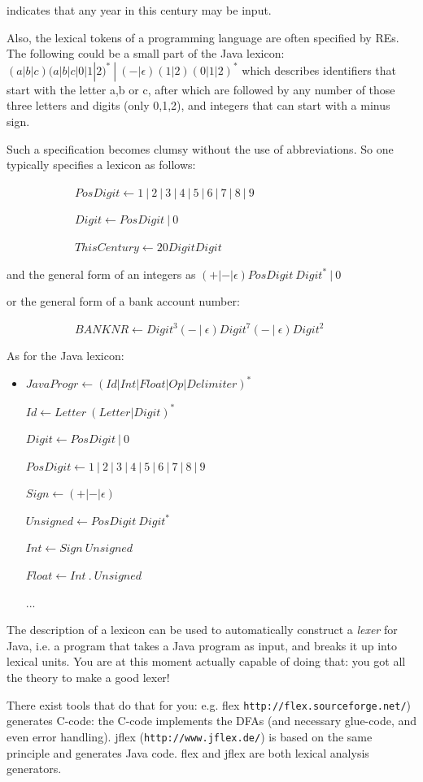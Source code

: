 indicates that any year in this century may be input.

Also, the lexical tokens of a programming language are often specified
by REs. The following could be a small part of the Java lexicon:
$(a|b|c)(a|b|c|0|1|2)^*~|~(-|\epsilon)(1|2)(0|1|2)^*$ which describes
identifiers that start with the letter a,b or c, after which are
followed by any number of those three letters and digits (only 0,1,2),
and integers that can start with a minus sign.

Such a specification becomes clumsy without the use of
abbreviations. So one typically specifies a lexicon as follows:


~~~~~~~~~~~~$PosDigit \leftarrow 1~|~2~|~3~|~4~|~5~|~6~|~7~|~8~|~9$

~~~~~~~~~~~~$Digit \leftarrow PosDigit~|~0$


~~~~~~~~~~~~$ThisCentury \leftarrow 20DigitDigit$

and the general form of an integers as $(+|-|\epsilon)PosDigit~Digit^*~|~0$

or the general form of a bank account number:


~~~~~~~~~~~~$BANKNR \leftarrow Digit^3(-~|~\epsilon)Digit^7(-~|~\epsilon)Digit^2$

As for the Java lexicon:


\begin{itemize}
\item[]
$JavaProgr \leftarrow (Id|Int|Float|Op|Delimiter)^*$

$Id \leftarrow Letter~(Letter|Digit)^*$

$Digit \leftarrow PosDigit~|~0$

$PosDigit \leftarrow 1~|~2~|~3~|~4~|~5~|~6~|~7~|~8~|~9$

$Sign \leftarrow (+|-|\epsilon)$

$Unsigned \leftarrow PosDigit~Digit^*$

$Int \leftarrow Sign~Unsigned$

$Float \leftarrow Int~.~Unsigned$

...
\end{itemize}

\label{flexlabel}
The description of a lexicon can be used to automatically construct a
{\em lexer} for Java, i.e. a program that takes a Java program as input,
and breaks it up into lexical units. You are at this moment actually
capable of doing that: you got all the theory to make a good lexer!

There exist tools that do that for you: e.g. flex
\verb|http://flex.sourceforge.net/|) generates C-code: the C-code
implements the DFAs (and necessary glue-code, and even error
handling). jflex (\verb|http://www.jflex.de/|) is based on the same principle and generates Java code. flex and jflex are both lexical
analysis generators.

